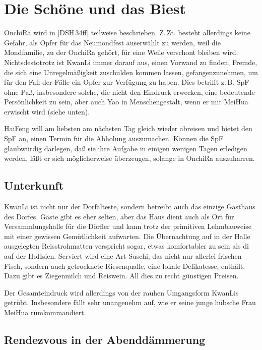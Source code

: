 \documentclass[
a4paper,
twoside,
DIV=calc,
BCOR=4mm,
fontsize=9pt,
twocolumn=on,
titlepage=on,
parskip=half
]{scrartcl}
\begin{document}
\section{Die Schöne und das Biest}
\label{biest}

OnchiRa wird in [DSH\,34ff] teilweise beschrieben. Z.\,Zt. besteht
allerdings keine Gefahr, als Opfer für das Neumondfest auserwählt zu
werden, weil die Mondfamilie, zu der OnchiRa gehört, für eine Weile
verschont bleiben wird. Nichtsdestotrotz ist KwanLi immer darauf aus,
einen Vorwand zu finden, Fremde, die sich eine Unregelmäßigkeit
zuschulden kommen lassen, gefangenzunehmen, um für den
Fall der Fälle ein Opfer zur Verfügung zu haben. Dies betrifft
z.\,B. SpF ohne Paß, insbesondere solche, die nicht den Eindruck
erwecken, eine bedeutende Persönlichkeit zu sein, aber auch Yao in
Menschengestalt, wenn er mit MeiHua erwischt wird (siehe unten).

HaiFeng will am liebsten am nächsten Tag gleich wieder abreisen und
bietet den SpF an, einen Termin für die Abholung auszumachen. Können
die SpF glaubwürdig darlegen, daß sie ihre Aufgabe in einigen wenigen
Tagen erledigen werden, läßt er sich möglicherweise überzeugen,
solange in OnchiRa auszuharren.

\subsection{Unterkunft}

KwanLi ist nicht nur der Dorfälteste, sondern betreibt auch das
einzige Gasthaus des Dorfes. Gäste gibt es eher selten, aber das Haus
dient auch als Ort für Versammlungshalle für die Dörfler und kann
trotz der primitiven Lehmbauweise mit einer gewissen Gemütlichkeit
aufwarten. Die Übernachtung auf in der Halle ausgelegten
Reisstrohmatten verspricht sogar, etwas komfortabler zu sein als di
auf der HoHsien. Serviert wird eine Art Suschi, das nicht nur allerlei
frischen Fisch, sondern auch getrocknete Riesenqualle, eine lokale
Delikatesse, enthält. Dazu gibt es Ziegenmilch und Reiswein. All dies
zu recht günstigen Preisen.

Der Gesamteindruck wird allerdings von der rauhen Umgangsform
KwanLis getrübt. Insbesondere fällt sehr unangenehm auf, wie er seine
junge hübsche Frau MeiHua rumkommandiert.

\subsection{Rendezvous in der Abenddämmerung}
\end{document}
